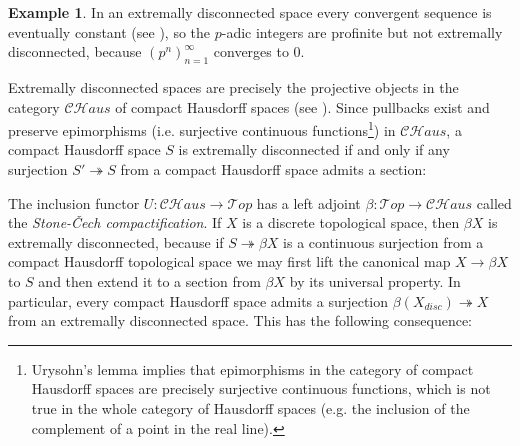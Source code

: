 \documentclass[11pt,A4]{article}
\theoremstyle{plain}
\theoremstyle{definition}
\newtheorem{exa}[thm]{Example}
\theoremstyle{remark}
\newcommand{\1}{\mathbbm{1}}
\newcommand{\Top}{\mathscr{T}op}
\newcommand{\CHaus}{\mathscr{CH}aus}
\begin{document}
\begin{exa}
    In an extremally disconnected space every convergent sequence is eventually constant (see \cite[Theorem 1.3]{gle58}), so the $p$-adic integers are profinite but not extremally disconnected, because $(p^{n})_{n=1}^{\infty}$ converges to $0$.
\end{exa}
    
Extremally disconnected spaces are precisely the projective objects in the category $\CHaus$ of compact Hausdorff spaces (see \cite[Theorem 2.5]{gle58}).
Since pullbacks exist and preserve epimorphisms (i.e. surjective continuous functions\footnote{Urysohn's lemma implies that epimorphisms in the category of compact Hausdorff spaces are precisely surjective continuous functions, which is not true in the whole category of Hausdorff spaces (e.g. the inclusion of the complement of a point in the real line).}) in $\CHaus$, a compact Hausdorff space $S$ is extremally disconnected if and only if any surjection $S'\twoheadrightarrow S$ from a compact Hausdorff space admits a section:
\begin{center}
\end{center}

The inclusion functor $U\colon \CHaus\to \Top$ has a left adjoint $\beta\colon \Top\to \CHaus$ called the \textit{Stone-\v{C}ech compactification}.
If $X$ is a discrete topological space, then $\beta X$ is extremally disconnected, because if $S\twoheadrightarrow \beta X$ is a continuous surjection from a compact Hausdorff topological space we may first lift the canonical map $X\to \beta X$ to $S$ and then extend it to a section from $\beta X$ by its universal property.
In particular, every compact Hausdorff space admits a surjection $\beta(X_{disc})\twoheadrightarrow X$ from an extremally disconnected space.
This has the following consequence:
\end{document}
